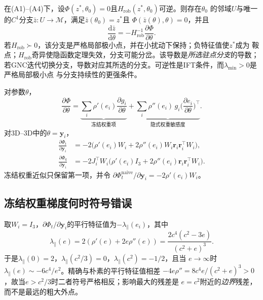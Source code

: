 \begin{theorem}[精确不动点IFT]\label{thm:ift}
在(A1)--(A4)下，设$\Phi(z^*,\theta_0)=0$且$H_{\mathrm{rob}}(z^*,\theta_0)$可逆。则存在$\theta_0$
的邻域$U$与唯一的$C^1$分支$\bar z:U\to\mathcal{M}$，满足$\bar z(\theta_0)=z^*$且
$\Phi(\bar z(\theta),\theta)=0$，并且
\begin{equation}
\frac{\mathrm{d}\bar z}{\mathrm{d}\theta}=-H_{\mathrm{rob}}^{-1}\frac{\partial\Phi}{\partial\theta}.
\end{equation}
若$H_{\mathrm{rob}}\succ0$，该分支是严格局部极小点，并在小扰动下保持；负特征值使$z^*$成为
鞍点；$H_{\mathrm{rob}}$奇异使隐函数定理失效，分支可能分岔。该导数是\emph{所选驻点分支}的导数；
若GNC迭代切换分支，导数对应其所选的分支。可逆性是IFT条件，而$\lambda_{\min}>0$是严格局部极小点
与分支持续性的更强条件。
\end{theorem}

\begin{theorem}[右端项分解]\label{thm:rhs}
对参数$\theta$，
\begin{equation}
\frac{\partial\Phi}{\partial\theta}
=\underbrace{\sum_i\rho'(e_i)\frac{\partial g_i}{\partial\theta}}_{\text{冻结权重项}}
+\underbrace{\sum_i\rho''(e_i)\,g_i\Big(\frac{\partial e_i}{\partial\theta}\Big)^\top}
_{\text{隐式权重敏感度}}.
\end{equation}
对3D--3D中的$\theta=\mathbf{y}_i$，
\begin{equation}
\begin{aligned}
\frac{\partial\Phi_t}{\partial\mathbf{y}_i}&=-2\big(\rho'(e_i)W_i
+2\rho''(e_i)W_i\mathbf{r}_i\mathbf{r}_i^\top W_i\big),\\
\frac{\partial\Phi_q}{\partial\mathbf{y}_i}&=-2J_i^\top W_i
\big(\rho'(e_i)I_3+2\rho''(e_i)\mathbf{r}_i\mathbf{r}_i^\top W_i\big).
\end{aligned}
\end{equation}
冻结权重近似只保留第一项，并令
$\partial\Phi_t^{\mathrm{naive}}/\partial\mathbf{y}_i=-2\rho'(e_i)W_i$。
\end{theorem}

\subsection{冻结权重梯度何时符号错误}
\label{sec:signflip}

取$W_i=I_3$，$\partial\Phi_t/\partial\mathbf{y}_i$的平行特征值为$-\lambda_\parallel(e_i)$，其中
\begin{equation}
\lambda_\parallel(e)=2(\rho'(e)+2e\rho''(e))=\frac{2c^4(c^2-3e)}{(c^2+e)^3}.
\end{equation}
于是$\lambda_\parallel(0)=2$，$\lambda_\parallel(c^2/3)=0$，$\lambda_\parallel(c^2)=-1/2$，且当
$e\to\infty$时$\lambda_\parallel(e)\sim-6c^4/e^2$。精确与朴素的平行特征值相差
$-4e\rho''=8c^4e/(c^2+e)^3>0$，故当$e>c^2/3$时二者符号严格相反；影响最大的残差是
$e=c^2$附近的\emph{边界}残差，而不是最远的粗大外点。

